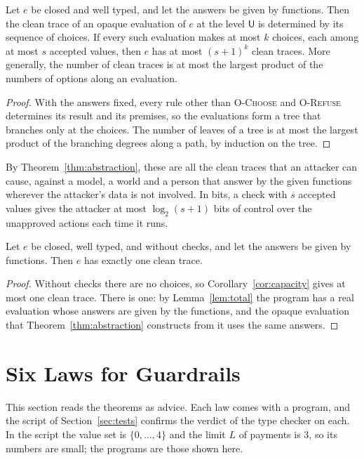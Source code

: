 \documentclass[acmsmall,nonacm,screen]{acmart}
\newcommand{\kw}[1]{\mathsf{#1}}
\newcommand{\U}{\kw{U}}
\begin{document}
\begin{corollary}[Capacity]
\label{cor:capacity}
Let $e$ be closed and well typed, and let the answers be given by functions. Then the clean
trace of an opaque evaluation of $e$ at the level $\U$ is determined by its sequence of
choices. If every such evaluation makes at most $k$ choices, each among at most $s$ accepted
values, then $e$ has at most $(s+1)^k$ clean traces. More generally, the number of clean
traces is at most the largest product of the numbers of options along an evaluation.
\end{corollary}

\begin{proof}
With the answers fixed, every rule other than \textsc{O-Choose} and \textsc{O-Refuse}
determines its result and its premises, so the evaluations form a tree that branches only at
the choices. The number of leaves of a tree is at most the largest product of the branching
degrees along a path, by induction on the tree.
\end{proof}

By Theorem~\ref{thm:abstraction}, these are all the clean traces that an attacker can cause,
against a model, a world and a person that answer by the given functions wherever the
attacker's data is not involved. In bits, a check with $s$ accepted values gives the
attacker at most $\log_2(s+1)$ bits of control over the unapproved actions each time it
runs.

\begin{corollary}
\label{cor:nocheck}
Let $e$ be closed, well typed, and without checks, and let the answers be given by
functions. Then $e$ has exactly one clean trace.
\end{corollary}

\begin{proof}
Without checks there are no choices, so Corollary~\ref{cor:capacity} gives at most one
clean trace. There is one: by Lemma~\ref{lem:total} the program has a real evaluation whose
answers are given by the functions, and the opaque evaluation that
Theorem~\ref{thm:abstraction} constructs from it uses the same answers.
\end{proof}

\section{Six Laws for Guardrails}
\label{sec:laws}

This section reads the theorems as advice. Each law comes with a program, and the script of
Section~\ref{sec:tests} confirms the verdict of the type checker on each. In the script the
value set is $\{0, \ldots, 4\}$ and the limit $L$ of payments is $3$, so its numbers are
small; the programs are those shown here.
\end{document}
